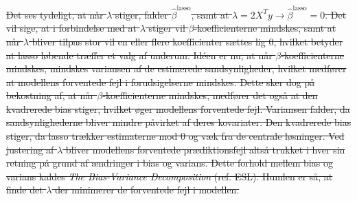 \documentclass[11pt,a4paper]{article}
\begin{document}
\sout{
Det ses tydeligt, at når $\lambda$ stiger, falder $\hat{\beta}^{\text{lasso}}$, samt at $\lambda=2X^Ty\rightarrow \hat{\beta}^{\text{lasso}}=0$. Det vil sige, at i forbindelse med at $\lambda$ stiger vil $\beta$-koefficienterne mindskes, samt at når $\lambda$ bliver tilpas stor vil en eller flere koefficienter sættes lig 0, hvilket betyder at lasso løbende træffer et valg af underum. Idéen er nu, at når $\beta$-koefficienterne mindskes, mindskes variansen af de estimerede sandsynligheder, hvilket medfører at modellens forventede fejl i forudsigelserne mindskes. Dette sker dog på bekostning af, at når $\beta$-koefficienterne mindskes, medfører det også at den kvadrerede bias stiger, hvilket øger modellens forventede fejl. Variansen falder, da sandsynlighederne bliver mindre påvirket af deres kovariater. Den kvadrerede bias stiger, da lasso trækker estimaterne mod 0 og væk fra de centrale løsninger. Ved justering af $\lambda$ bliver modellens forventede prædiktionsfejl altså trukket i hver sin retning på grund af ændringer i bias og varians. Dette forhold mellem bias og varians kaldes \textit{The Bias-Variance Decomposition} (ref. ESL). Humlen er så, at finde det $\lambda$ der minimerer de forventede fejl i modellen.}\\ 
\end{document}

